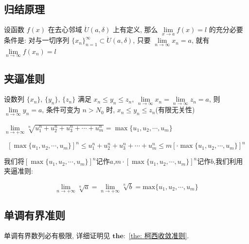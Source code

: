 \subsection{归结原理}
\begin{definition}[归结原理]
	设函数 $f(x)$ 在去心邻域 $\mathring{U}(a,\delta)$ 上有定义, 那么 $\lim\limits_{x\to a}f(x) = l$ 的充分必要条件是: 对与一切序列 $\{x_{n}\}_{n=1}^{\infty}\subset \mathring{U}(a,\delta)$, 只要 $\lim\limits_{n\to\infty}x_{n}=a$, 就有 $\lim\limits_{n\to\infty}f(x_{n})=l$
\end{definition}
\subsection{夹逼准则}
\begin{definition}[夹逼准则]
	设数列 $\{x_{n}\}$, $\{y_{n}\}$, $\{z_{n}\}$ 满足 $x_{n}\leq y_{n}\leq z_{n}$, $\lim\limits_{n\to\infty}x_{n}=\lim\limits_{n\to\infty}z_{n}=a$, 则 $\lim\limits_{n\to\infty}y_{n}=a$, 条件可变为 $n>N_{0}$ 时, $x_{n}\leq y_{n}\leq z_{n}$(有限无关性)
\end{definition}

\begin{corollary}[夹逼准则]
	$\lim\limits_{n\rightarrow +\infty}\sqrt[n]{u_{1}^{n}+u_{2}^{n}+u_{3}^{n}+\cdots+u_{m}^{n}}=\max\{ u_{1},u_{2},\cdots,u_{m}\}$
	\begin{anymark}[证明]
		$$[\max\{ u_{1},u_{2},\cdots,u_{m}\}]^{n}\leq u_{1}^{n}+u_{2}^{n}+u_{3}^{n}+\cdots+u_{m}^{n}\leq m[\cdot\max\{ u_{1},u_{2},\cdots,u_{m}\}]^{n}$$
	
		我们将$[\max\{ u_{1},u_{2},\cdots,u_{m}\}]^{n}$记作$a$,$m\cdot[\max\{ u_{1},u_{2},\cdots,u_{m}\}]^{n}$记作$b$,我们利用夹逼准则:

	$$\lim\limits_{n\rightarrow +\infty}\sqrt[n]{a}=\lim\limits_{n\rightarrow +\infty}\sqrt[n]{b}=\text{max}\{ u_{1},u_{2},\cdots,u_{m}\}$$
	\end{anymark}
\end{corollary}

\subsection{单调有界准则}
\begin{definition}[单调有界准则]
	单调有界数列必有极限, 详细证明见 $\mathbf{the:}$ \ref{the: 柯西收敛准则}.
\end{definition}
